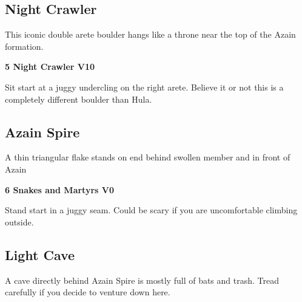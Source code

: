 \begin{multicols}{2}
			
		


		\needspace{1.5cm}
		\subsection*{Night Crawler}\label{bf:Night Crawler}
		This iconic double arete boulder hangs like a throne near the top of the Azain formation.\\
	
		
			
			\needspace{1.5cm}
\label{rt:Night Crawler}
\colorbox{red!20}{
\parbox{0.95\linewidth}{
\textbf{
5 Night Crawler V10  
}}}

			\begin{adjustwidth}{0.5cm}{}			
			Sit start at a juggy undercling on the right arete. Believe it or not this is a completely different boulder than Hula.
			\end{adjustwidth}
			
			
		


		\needspace{1.5cm}
		\subsection*{Azain Spire}\label{bf:Azain Spire}
		A thin triangular flake stands on end behind swollen member and in front of Azain\\
	
		
			
			\needspace{1.5cm}
\label{rt:Snakes and Martyrs}
\colorbox{green!20}{
\parbox{0.95\linewidth}{
\textbf{
6 Snakes and Martyrs V0  
}}}

			\begin{adjustwidth}{0.5cm}{}			
			 Stand start in a juggy seam. Could be scary if you are uncomfortable climbing outside.
			\end{adjustwidth}
			
			
		
		
		\needspace{1.5cm}
		\subsection*{Light Cave}\label{bf:Light Cave}
		A cave directly behind Azain Spire is mostly full of bats and trash. Tread carefully if you decide to venture down here.\\
	

\end{multicols}

